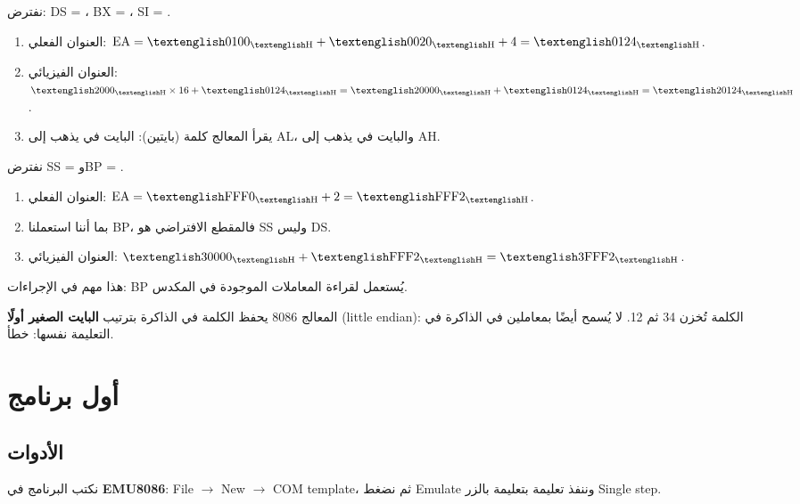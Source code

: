 \begin{khatwa}
    نفترض: \textenglish{DS = }، \textenglish{BX = }، \textenglish{SI = }.
    \begin{enumerate}
        \item العنوان الفعلي: $\text{EA} = \hex{0100} + \hex{0020} + 4 = \hex{0124}$.
        \item العنوان الفيزيائي: $\hex{2000} \times 16 + \hex{0124} = \hex{20000} + \hex{0124} = \hex{20124}$.
        \item يقرأ المعالج كلمة (بايتين): البايت في  يذهب إلى \textenglish{AL}، والبايت في
               يذهب إلى \textenglish{AH}.
    \end{enumerate}
\end{khatwa}

\begin{khatwa}
    نفترض \textenglish{SS = } و\textenglish{BP = }.
    \begin{enumerate}
        \item العنوان الفعلي: $\text{EA} = \hex{FFF0} + 2 = \hex{FFF2}$.
        \item بما أننا استعملنا \textenglish{BP}، فالمقطع الافتراضي هو \textenglish{SS} وليس \textenglish{DS}.
        \item العنوان الفيزيائي: $\hex{30000} + \hex{FFF2} = \hex{3FFF2}$.
    \end{enumerate}
    هذا مهم في الإجراءات: \textenglish{BP} يُستعمل لقراءة المعاملات الموجودة في المكدس.
\end{khatwa}

\begin{intabih}
    المعالج \textenglish{8086} يحفظ الكلمة في الذاكرة بترتيب \textbf{البايت الصغير أولًا}
    \textenglish{(little endian)}: الكلمة  تُخزن \textenglish{34} ثم \textenglish{12}. لا يُسمح أيضًا
    بمعاملين في الذاكرة في التعليمة نفسها:  خطأ.
\end{intabih}

\section{أول برنامج}

\subsection{الأدوات}
نكتب البرنامج في \textbf{\textenglish{EMU8086}}: \textenglish{File $\rightarrow$ New $\rightarrow$}
\textenglish{COM template}، ثم نضغط \textenglish{Emulate} وننفذ تعليمة بتعليمة بالزر \textenglish{Single step}.

